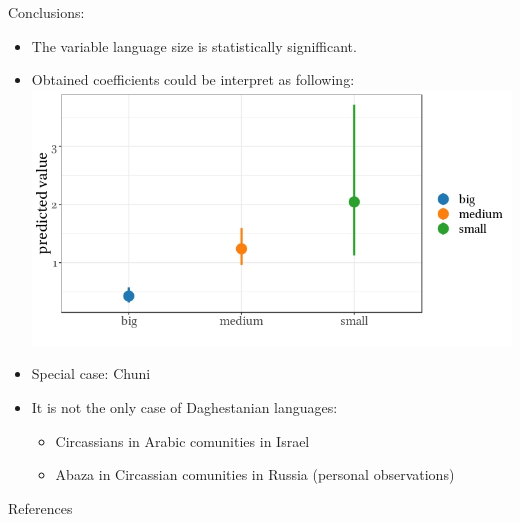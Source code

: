 \documentclass[13pt, t]{beamer}
\begin{document}
\begin{frame}{Conclusions:}
\begin{itemize}
\item The variable language size is statistically signifficant.
\item Obtained coefficients could be interpret as following:\\
\includegraphics[width=\linewidth]{images/15_predicted_750_400} \pause
\item Special case: Chuni \pause
\item It is not the only case of Daghestanian languages:
\begin{itemize}
\item Circassians in Arabic comunities in Israel \citep{kreindler95}
\item Abaza in Circassian comunities in Russia (personal observations)
\end{itemize}
\end{itemize}
\end{frame}


\begin{frame}{References}
\footnotesize


\end{frame}
\end{document}
